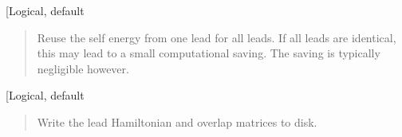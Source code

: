 \documentclass[letterpaper,10pt,english]{sphinxmanual}
\begin{document}
 {[}Logical, default \sphinxcode{etrans\_same\_leads: F}{]}
\begin{quote}

\begin{DUlineblock}{0em}
\item[] Reuse the self energy from one lead for all leads. If all leads are
identical, this may lead to a small computational saving. The saving
is typically negligible however.
\end{DUlineblock}
\end{quote}

 {[}Logical, default \sphinxcode{etrans\_write\_hs: F}{]}
\begin{quote}

\begin{DUlineblock}{0em}
\item[] Write the lead Hamiltonian and overlap matrices to disk.
\end{DUlineblock}
\end{quote}
\end{document}
